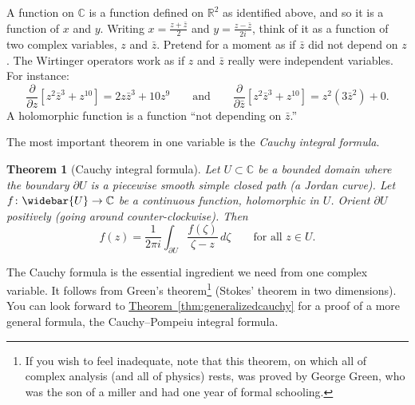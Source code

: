 \documentclass[12pt,openany]{book}
\newcommand{\C}{{\mathbb{C}}}
\newcommand{\R}{{\mathbb{R}}}
\newcommand{\myindex}[1]{#1\index{#1}}
\theoremstyle{plain}
\newtheorem{thm}{Theorem}[section]
\theoremstyle{remark}
\theoremstyle{definition}
\theoremstyle{exercise}
\theoremstyle{example}
\newcommand{\thmref}[1]{\hyperref[#1]{Theorem~\ref*{#1}}}
\begin{document}
A function on $\C$ is a function defined on
$\R^2$ as identified above, and so it is a function of $x$ and $y$.
Writing
$x = \frac{z+\bar{z}}{2}$ and
$y = \frac{z-\bar{z}}{2i}$, think of it as a function of two
complex variables, $z$ and $\bar{z}$.  Pretend for a moment as if $\bar{z}$ did not
depend on $z$.
The Wirtinger operators
work as if $z$ and $\bar{z}$ really were independent variables.  For
instance:
\begin{equation*}
\frac{\partial}{\partial z}
\left[ z^2 \bar{z}^3 + z^{10} \right]
=
2z \bar{z}^3 + 10 z^{9}
\qquad
\text{and}
\qquad
\frac{\partial}{\partial \bar{z}}
\left[ z^2 \bar{z}^3 + z^{10} \right]
=
z^2 ( 3 \bar{z}^2 ) + 0 .
\end{equation*}
A holomorphic function is a function ``not depending on $\bar{z}$.''

The most important theorem in one variable is
the \emph{\myindex{Cauchy integral formula}}.

\begin{thm}[Cauchy integral formula]
Let $U \subset \C$ be a bounded domain where the boundary $\partial U$
is a piecewise smooth
simple closed path (a Jordan curve).  Let $f \colon \widebar{U} \to \C$ be a continuous function,
holomorphic in $U$.
Orient $\partial U$ positively (going around counter-clockwise).
Then
\begin{equation*}
f(z) =
\frac{1}{2\pi i}
\int_{\partial U}
\frac{f(\zeta)}{\zeta-z}
\,
d \zeta
\qquad \text{for all $z \in U$.}
\end{equation*}
\end{thm}

The Cauchy formula is the essential ingredient we need from
one complex variable.  It follows
from Green's theorem\footnote{If you wish to feel inadequate,
note that this theorem, on which all of complex analysis (and all of physics)
rests, was proved by
George Green, who was the son of a miller and had one year of formal
schooling.}  (Stokes' theorem in two
dimensions).  You can look forward to
\thmref{thm:generalizedcauchy} for a proof of a more general formula,
the Cauchy--Pompeiu integral formula.
\end{document}
